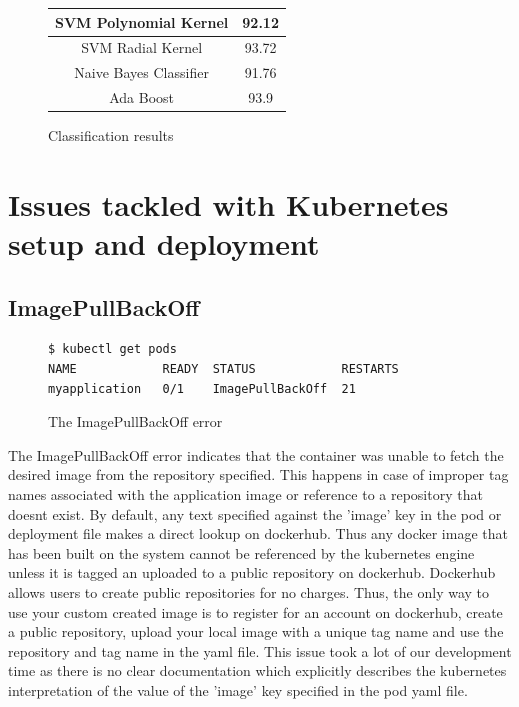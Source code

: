 \documentclass[9pt,twocolumn,twoside]{../../styles/osajnl}
\begin{document}
{\begin{figure}[ht]
\begin{center}
\begin{tabular}{|c | c|}
SVM Polynomial Kernel & 92.12 \\
\hline

SVM Radial Kernel & 93.72 \\[1ex]
\hline

Naive Bayes Classifier & 91.76 \\[1ex]

\hline
Ada Boost  & 93.9 \\[1ex]
\hline

\end{tabular}
\end{center}
  \caption{Classification results}
\end{figure}


\section{Issues tackled with Kubernetes setup and deployment}

\subsection{ImagePullBackOff}

\begin{figure}[H]
\begin{verbatim}
$ kubectl get pods
NAME            READY  STATUS            RESTARTS  
myapplication   0/1    ImagePullBackOff  21         
\end{verbatim}
\caption{The ImagePullBackOff error}
\vspace{-3mm}
\label{The ImagePullBackOff error}
\end{figure}

The ImagePullBackOff error indicates that the container was unable to
fetch the desired image from the repository specified. This happens in
case of improper tag names associated with the application image or
reference to a repository that doesnt exist. By default, any text
specified against the 'image' key in the pod or deployment file makes
a direct lookup on dockerhub. Thus any docker image that has been
built on the system cannot be referenced by the kubernetes engine
unless it is tagged an uploaded to a public repository on
dockerhub. Dockerhub allows users to create public repositories for no
charges. Thus, the only way to use your custom created image is to
register for an account on dockerhub, create a public repository,
upload your local image with a unique tag name and use the repository
and tag name in the yaml file. This issue took a lot of our
development time as there is no clear documentation which explicitly
describes the kubernetes interpretation of the value of the 'image'
key specified in the pod yaml file.

}
\end{document}
